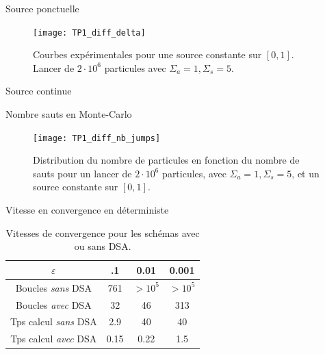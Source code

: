 \documentclass[17pt]{beamer}
\begin{document}
\begin{frame}{Source ponctuelle}
   {
    \begin{figure}
      \centering
      \texttt{[image: TP1\_diff\_delta]}
      \caption{Courbes expérimentales pour une source constante sur $[0,1]$. Lancer de $2\cdot10^6$ particules avec $\Sigma_a = 1, \Sigma_s = 5$.}
      \label{fig:TP1_diff}
    \end{figure}
    }
\end{frame}

\begin{frame}{Source continue}
\end{frame}

\begin{frame}{Nombre sauts en Monte-Carlo}
  \begin{figure}
    \centering
    \texttt{[image: TP1\_diff\_nb\_jumps]}
    \caption{Distribution du nombre de particules en fonction du nombre de sauts pour un lancer de $2\cdot10^6$ particules, avec $\Sigma_a = 1, \Sigma_s = 5$, et un source constante sur $[0,1]$.}
    \label{fig:nbjumps}
  \end{figure}
\end{frame}

\begin{frame}{Vitesse en convergence en déterministe}
  \begin{table}
    \centering
    \begin{tabular}{c|ccc}
      $\varepsilon $ & .1 & 0.01 & 0.001 \\
      \hline
      Boucles \textit{sans} DSA & 761 & $>10^5$ & $>10^5$ \\
      Boucles \textit{avec} DSA & 32 & 46 & 313 \\
      \hline
      Tps calcul \textit{sans} DSA & 2.9 & 40 & 40 \\
      Tps calcul \textit{avec} DSA & 0.15 & 0.22 & 1.5 \\
    \end{tabular}
    \caption{Vitesses de convergence pour les schémas avec ou sans DSA.}
    \label{tab:DSA}
  \end{table}
\end{frame}
\end{document}

